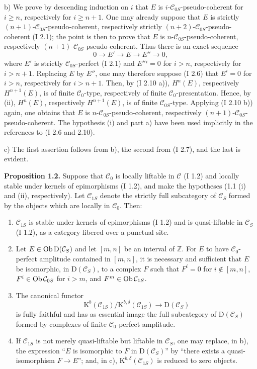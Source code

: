 \documentclass[11pt]{article}
\begin{document}
b) We prove by descending induction on $i$ that $E$ is $i$-$\mathcal C_{0S}$-pseudo-coherent for $i\ge n$, respectively for $i\ge n+1$. One may already suppose that $E$ is strictly $(n+1)$-$\mathcal C_{0S}$-pseudo-coherent, respectively strictly $(n+2)$-$\mathcal C_{0S}$-pseudo-coherent (I 2.1); the point is then to prove that $E$ is $n$-$\mathcal C_{0S}$-pseudo-coherent, respectively $(n+1)$-$\mathcal C_{0S}$-pseudo-coherent. Thus there is an exact sequence
\[
0\longrightarrow E'\longrightarrow E\longrightarrow E''\longrightarrow0,
\]
where $E'$ is strictly $\mathcal C_{0S}$-perfect (I 2.1) and $E''{}^i=0$ for $i>n$, respectively for $i>n+1$. Replacing $E$ by $E''$, one may therefore suppose (I 2.6) that $E^i=0$ for $i>n$, respectively for $i>n+1$. Then, by (I 2.10 a)), $H^n(E)$, respectively $H^{n+1}(E)$, is of finite $\mathcal C_0$-type, respectively of finite $\mathcal C_0$-presentation. Hence, by (ii), $H^n(E)$, respectively $H^{n+1}(E)$, is of finite $\mathcal C_{0S}$-type. Applying (I 2.10 b)) again, one obtains that $E$ is $n$-$\mathcal C_{0S}$-pseudo-coherent, respectively $(n+1)$-$\mathcal C_{0S}$-pseudo-coherent. The hypothesis (i) and part a) have been used implicitly in the references to (I 2.6 and 2.10).

c) The first assertion follows from b), the second from (I 2.7), and the last is evident.

\textbf{Proposition 1.2.} Suppose that $\mathcal C_0$ is locally liftable in $\mathcal C$ (I 1.2) and locally stable under kernels of epimorphisms (I 1.2), and make the hypotheses (1.1 (i) and (ii), respectively). Let $\mathcal C_{1S}$ denote the strictly full subcategory of $\mathcal C_S$ formed by the objects which are locally in $\mathcal C_0$. Then:
\begin{enumerate}[label=\alph*)]
\item $\mathcal C_{1S}$ is stable under kernels of epimorphisms (I 1.2) and is quasi-liftable in $\mathcal C_S$ (I 1.2), as a category fibered over a punctual site.
\item Let $E\in\operatorname{Ob}\mathrm D(\mathcal C_S)$ and let $[m,n]$ be an interval of $\mathbb Z$. For $E$ to have $\mathcal C_0$-perfect amplitude contained in $[m,n]$, it is necessary and sufficient that $E$ be isomorphic, in $\mathrm D(\mathcal C_S)$, to a complex $F$ such that $F^i=0$ for $i\notin[m,n]$, $F^i\in\operatorname{Ob}\mathcal C_{0S}$ for $i>m$, and $F^m\in\operatorname{Ob}\mathcal C_{1S}$.
\item The canonical functor
\[
\mathrm K^b(\mathcal C_{1S})/\mathrm K^{b,\delta}(\mathcal C_{1S})
\longrightarrow \mathrm D(\mathcal C_S)
\]
is fully faithful and has as essential image the full subcategory of $\mathrm D(\mathcal C_S)$ formed by complexes of finite $\mathcal C_0$-perfect amplitude.
\item If $\mathcal C_{1S}$ is not merely quasi-liftable but liftable in $\mathcal C_S$, one may replace, in b), the expression ``$E$ is isomorphic to $F$ in $\mathrm D(\mathcal C_S)$'' by ``there exists a quasi-isomorphism $F\to E$''; and, in c), $\mathrm K^{b,\delta}(\mathcal C_{1S})$ is reduced to zero objects.
\end{enumerate}
\end{document}
